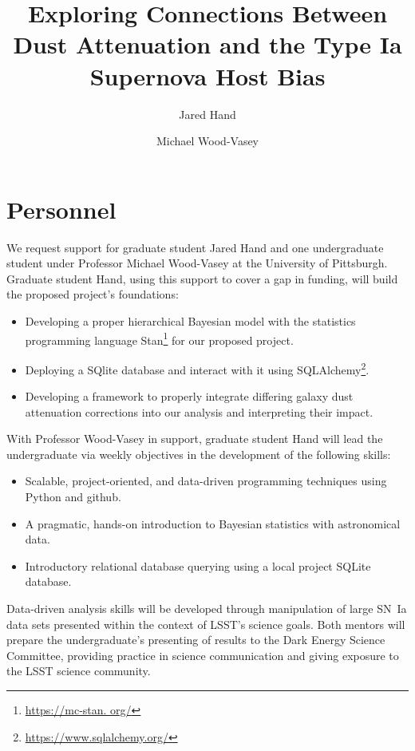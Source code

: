 \documentclass[modern]{aastex63}
\begin{document}
\title{Exploring Connections Between Dust Attenuation and the Type Ia Supernova Host Bias}

\author{Jared Hand}
\author{Michael Wood-Vasey}
\section{Personnel}
We request support for graduate student Jared Hand and one undergraduate student under Professor Michael Wood-Vasey at the University of Pittsburgh.
Graduate student Hand, using this support to cover a gap in funding, will build the proposed project's foundations:
\begin{itemize}
    \item Developing a proper hierarchical Bayesian model with the statistics programming language Stan\footnote{\url{https://mc-stan.
    org/}} for our proposed project.
    \item Deploying a SQlite database and interact with it using SQLAlchemy\footnote{\url{https://www.sqlalchemy.org/}}.
    \item Developing a framework to properly integrate differing galaxy dust attenuation corrections into our analysis and interpreting their impact.
\end{itemize}
With Professor Wood-Vasey in support, graduate student Hand will lead the undergraduate via weekly objectives in the development of the following skills:
\begin{itemize}
    \item Scalable, project-oriented, and data-driven programming techniques using Python and github.
    \item A pragmatic, hands-on introduction to Bayesian statistics with astronomical data. 
    \item Introductory relational database querying using a local project SQLite database.
\end{itemize}
Data-driven analysis skills will be developed through manipulation of large SN~Ia data sets presented within the context of LSST's science goals.
Both mentors will prepare the undergraduate's presenting of results to the Dark Energy Science Committee, providing practice in science communication and giving exposure to the LSST science community.
\end{document}
